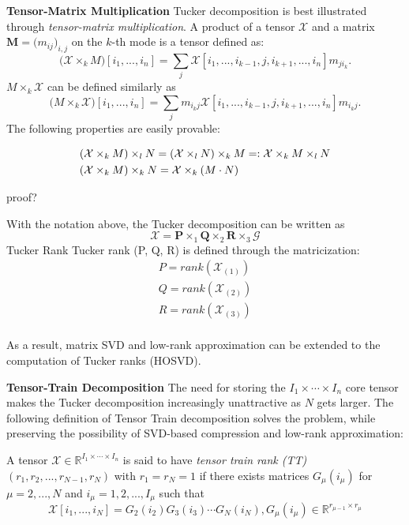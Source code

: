 {\bf Tensor-Matrix Multiplication}
Tucker decomposition is best illustrated through \textit{tensor-matrix multiplication}. A product of a tensor $\mathcal{X}$ and a matrix $\bm M=\big(m_{ij}\big)_{i,j}$ on the $k$-th mode is a tensor defined as:
\begin{equation}
    \big(\mathcal{X}\times_kM\big)[i_1,...,i_n] = 
    \sum_j \mathcal{X}[i_1,...,i_{k-1},j,i_{k+1},...,i_n]m_{ji_k}.
\end{equation}
$M\times_k\mathcal{X}$ can be defined similarly as
\begin{equation}
    \big(M\times_k\mathcal{X}\big)[i_1,...,i_n] = 
    \sum_j m_{i_kj}\mathcal{X}[i_1,...,i_{k-1},j,i_{k+1},...,i_n]m_{i_kj}.
\end{equation}
The following properties are easily provable:
\begin{lemma}
\begin{equation}
\aligned
&(\mathcal{X}\times_k M)\times_l N = (\mathcal{X}\times_l N)\times_k M =: \mathcal{X}\times_k M\times_l N\\
&(\mathcal{X}\times_k M)\times_k N = \mathcal{X}\times_k(M\cdot N)
\endaligned
\end{equation}
\end{lemma}
{\color{red}proof?}

With the notation above, the Tucker decomposition can be written as
\begin{equation}
\label{etucker}
\mathcal{X} = \bm P\times_1 \bm Q\times_2 \bm R\times_3 \mathcal{G}
\end{equation}
{Tucker Rank}
Tucker rank (P, Q, R) is defined through the matricization:
\begin{align*}
P = rank(\mathcal{X}_{(1)})\\
Q = rank(\mathcal{X}_{(2)})\\
R = rank(\mathcal{X}_{(3)})\\
\end{align*}

As a result, matrix SVD and low-rank approximation can be extended to the computation of Tucker ranks (HOSVD). 

{\bf Tensor-Train Decomposition}
The need for storing the $I_1\times\cdots\times I_n$ core tensor makes the Tucker decomposition increasingly unattractive as $N$ gets larger. The following definition of Tensor Train decomposition solves the problem, while preserving the possibility of SVD-based compression and low-rank approximation:
\begin{definition}
A tensor $\mathcal{X}\in\mathbb{R}^{I_1\times\cdots\times I_n}$ is said to have \textit{tensor train rank (TT)} $(r_1, r_2,...,r_{N-1}, r_N)$ with $r_1 = r_N = 1$ if there exists matrices $G_\mu(i_\mu)$ for $\mu=2,...,N$ and $i_\mu=1,2,...,I_\mu$ such that 
\begin{equation}
\mathcal{X}[i_1,...,i_N] = G_2(i_2) G_3(i_3)\cdots G_N(i_N), G_\mu(i_\mu)\in\mathbb{R}^{r_{\mu-1}\times r_\mu}
\end{equation}
\end{definition}
